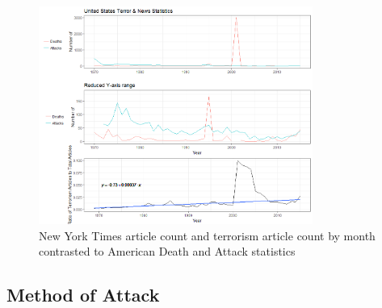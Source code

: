 \documentclass[10pt,a4paper]{article}
\begin{document}
\begin{center}
\begin{figure}[H]
		
	\includegraphics[width=0.8\textwidth]{Plots/NewsData/AttackNewsData.png}
	\caption{New York Times article count and terrorism article count by month contrasted to American Death and Attack statistics}
	
\end{figure}
\end{center}
	
\pagebreak
\subsection{Method of Attack}
\end{document}
